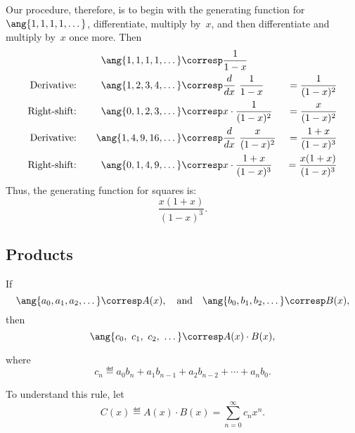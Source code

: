 Our procedure, therefore, is to begin with the generating function for
$\ang{1, 1, 1, 1, \dots}$, differentiate, multiply by~$x$, and then
differentiate and multiply by~$x$ once more.  Then
%
\begingroup
{}
\begin{alignat*}{3}
&\quad&
\ang{1, 1, 1, 1, \dots}  & \corresp \frac{1}{1-x}
&\enskip& \\
\text{Derivative:} &&
\ang{1, 2, 3, 4, \dots}  & \corresp \frac{d}{dx} \ \frac{1}{1-x}
                                          &{}= \frac{1}{(1-x)^2}\\
\text{Right-shift:} &&
\ang{0, 1, 2, 3, \dots}  & \corresp x \cdot \frac{1}{(1-x)^2}
                                          &{}= \frac{x}{(1-x)^2}\\
\text{Derivative:} &&
\ang{1, 4, 9, 16, \dots} & \corresp \frac{d}{dx} \ \frac{x}{(1-x)^2}
                                          &{}= \frac{1+x}{(1-x)^3} \\
\text{Right-shift:} &&
\ang{0, 1, 4, 9, \dots}  & \corresp x \cdot \frac{1+x}{(1-x)^3}
                                          &{}= \frac{x(1+x)}{(1-x)^3}
\end{alignat*}
\endgroup
%
Thus, the generating function for squares is:
%
\begin{equation}\label{squares_gen_func}
    \frac{x(1+x)}{(1-x)^3}.
\end{equation}

\subsection{Products}

\begin{rul}
\label{rule:product}
If
%
\[
\ang{a_0, a_1, a_2, \dots} \corresp A(x),\quad \text{and}\quad
\ang{b_0, b_1, b_2, \dots} \corresp B(x),
\]
%
then
%
\[
\ang{c_0,\ c_1 ,\ c_2,\ \dots} \corresp A(x) \cdot B(x),
\]
\end{rul}
where
\[
c_n \eqdef a_0 b_n + a_1 b_{n-1} + a_2 b_{n-2} + \cdots + a_n b_0.
\]

To understand this rule, let
\[
C(x) \eqdef A(x) \cdot B(x) = \sum_{n=0}^{\infty} c_n x^n.
\]

